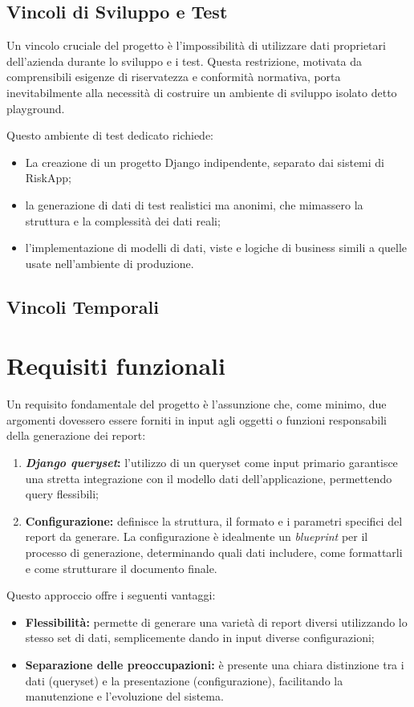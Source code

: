 	\subsection{Vincoli di Sviluppo e Test}
	Un vincolo cruciale del progetto è l'impossibilità di utilizzare dati proprietari dell'azienda durante lo sviluppo e i test. Questa restrizione, motivata da comprensibili esigenze di riservatezza e conformità normativa, porta inevitabilmente alla necessità di costruire un ambiente di sviluppo isolato detto \gls{playground}.
	
	Questo ambiente di test dedicato richiede:
	\begin{itemize}
		\item La creazione di un progetto Django indipendente, separato dai sistemi di RiskApp;
		\item la generazione di dati di test realistici ma anonimi, che mimassero la struttura e la complessità dei dati reali;
		\item l'implementazione di modelli di dati, viste e logiche di business simili a quelle usate nell'ambiente di produzione.
	\end{itemize}
	
	\subsection{Vincoli Temporali}


\section{Requisiti funzionali}
Un requisito fondamentale del progetto è l'assunzione che, come minimo, due argomenti dovessero essere forniti in input agli oggetti o funzioni responsabili della generazione dei report:
\begin{enumerate}
	\item \textbf{\textit{Django queryset}:} l'utilizzo di un \gls{queryset} come input primario garantisce una stretta integrazione con il modello dati dell'applicazione, permettendo query flessibili;
	\item \textbf{Configurazione:} definisce la struttura, il formato e i parametri specifici del report da generare. La configurazione è idealmente un \textit{blueprint} per il processo di generazione, determinando quali dati includere, come formattarli e come strutturare il documento finale.
\end{enumerate}

Questo approccio offre i seguenti vantaggi:
\begin{itemize}
	\item \textbf{Flessibilità:} permette di generare una varietà di report diversi utilizzando lo stesso set di dati, semplicemente dando in input diverse configurazioni;
	\item \textbf{Separazione delle preoccupazioni:} è presente una chiara distinzione tra i dati (\gls{queryset}) e la presentazione (configurazione), facilitando la manutenzione e l'evoluzione del sistema.
\end{itemize}

\newpage